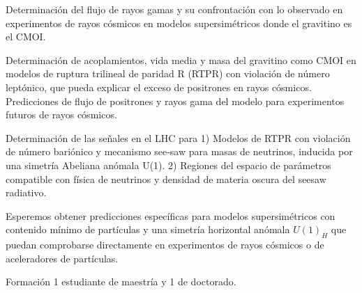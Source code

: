 \begin{ideas}
  

Determinación del flujo de rayos gamas y su confrontación con lo observado en experimentos de rayos cósmicos en modelos supersimétricos donde el gravitino es el CMOI.

Determinación de acoplamientos, vida media y masa del gravitino como CMOI en modelos de ruptura trilineal de paridad R (RTPR) con violación de número leptónico, que pueda explicar el exceso de positrones en rayos cósmicos. Predicciones de flujo de positrones y rayos gama del modelo para experimentos futuros de rayos cósmicos. 


Determinación de las señales en el LHC para 1) Modelos de RTPR con violación de número bariónico y mecanismo see-saw para masas de neutrinos, inducida por una simetría Abeliana anómala U(1). 2) Regiones del espacio de parámetros compatible con física de neutrinos y densidad de materia oscura del seesaw radiativo.



Esperemos obtener predicciones específicas para modelos supersimétricos con contenido mínimo de partículas y una simetría horizontal anómala $U(1)_H$ que puedan comprobarse directamente en experimentos de rayos cósmicos o de aceleradores de partículas.

Formación 1 estudiante de maestría y 1 de doctorado.
\end{ideas}

